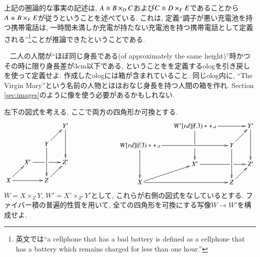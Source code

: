 
上記の圏論的な事実の記述は, $A\cong B\times_DC$および$C\cong D\times_FE$であることから$A\cong B\times_FE$が従うということを述べている. これは, 定義``調子が悪い充電池を持つ携帯電話は, 一時間未満しか充電が持たない充電池を持つ携帯電話として定義される''\footnote{英文では``a cellphone that has a bad battery is defined as a cellphone that has a battery which remains charged for less than one hour.''}ことが推論できたということである.


\begin{exercise}~
\sexc 二人の人間が``ほぼ同じ身長である(of approximately the same height)''時かつその時に限り身長差が3cm以下である, ということをを定義するologを引き戻しを使って定義せよ. 作成したologには箱が含まれていること.
\next 同じolog内に, ``The Virgin Mary''という名前の人物とほほおなじ身長を持つ人間の箱を作れ. Section \ref{sec:images}のように像を使う必要があるかもしれない.
\endsexc
\end{exercise}

\begin{exercise}\label{exc:pointwise map of fp}
左下の図式を考える. ここで両方の四角形か可換とする.
$$
\xymatrix@=15pt{
&&&Y'\ar[dd]\\
&&Y\ar[ru]\ar[dd]\\
&X'\ar'[r][rr]&&Z'\\
X\ar[rr]\ar[ru]&&Z\ar[ru]
}
\hspace{1in}
\xymatrix@=15pt{
&W'\ar[rr]\ar'[d][dd]\ullimit&&Y'\ar[dd]\\
W\ar[rr]\ar[dd]\ullimit&&Y\ar[ru]\ar[dd]\\
&X'\ar'[r][rr]&&Z'\\
X\ar[rr]\ar[ru]&&Z\ar[ru]
}
$$
$W=X\times_ZY$, $W'=X'\times_{Z'}Y'$として, これらが右側の図式をなしているとする. ファイバー積の普遍的性質を用いて, 全ての四角形を可換にする写像$W\to W'$を構成せよ.
\end{exercise}

